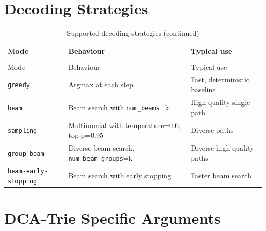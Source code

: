 \documentclass[11pt,a4paper,oneside,openany]{book}
\theoremstyle{definition}
\begin{document}
\section{Decoding Strategies}

\begin{longtable}{lp{5cm}p{8cm}}
	\caption{Supported decoding strategies}
	\label{tab:decoding}                                                                                            \\
	\toprule
	Mode                         & Behaviour                                         & Typical use                  \\
	\midrule
	\endfirsthead
	\caption[]{Supported decoding strategies (continued)}                                                           \\
	\toprule
	Mode                         & Behaviour                                         & Typical use                  \\
	\midrule
	\endhead
	\bottomrule
	\endfoot
	\texttt{greedy}              & Argmax at each step                               & Fast, deterministic baseline \\
	\texttt{beam}                & Beam search with \texttt{num\_beams}=k            & High-quality single path     \\
	\texttt{sampling}            & Multinomial with temperature=0.6, top-p=0.95      & Diverse paths                \\
	\texttt{group-beam}          & Diverse beam search, \texttt{num\_beam\_groups}=k & Diverse high-quality paths   \\
	\texttt{beam-early-stopping} & Beam search with early stopping                   & Faster beam search           \\
\end{longtable}

\section{DCA-Trie Specific Arguments}
\end{document}
